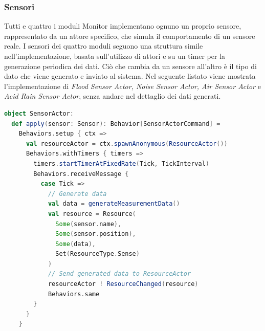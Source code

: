 \documentclass{scrartcl}
\begin{document}
\subsubsection{Sensori}
Tutti e quattro i moduli Monitor implementano ognuno un proprio sensore, rappresentato da un attore specifico, che simula il comportamento di un sensore reale. I sensori dei quattro moduli seguono una struttura simile nell'implementazione, basata sull'utilizzo di attori e su un timer per la generazione periodica dei dati. Ciò che cambia da un sensore all'altro è il tipo di dato che viene generato e inviato al sistema.
Nel seguente listato viene mostrata l'implementazione di \textit{Flood Sensor Actor,
    Noise Sensor Actor, Air Sensor Actor} e \textit{Acid Rain Sensor Actor}, senza andare nel dettaglio dei dati generati.

\begin{lstlisting}[language=Scala]
object SensorActor:
  def apply(sensor: Sensor): Behavior[SensorActorCommand] =
    Behaviors.setup { ctx =>
      val resourceActor = ctx.spawnAnonymous(ResourceActor())
      Behaviors.withTimers { timers =>
        timers.startTimerAtFixedRate(Tick, TickInterval)
        Behaviors.receiveMessage {
          case Tick =>
            // Generate data
            val data = generateMeasurementData()
            val resource = Resource(
              Some(sensor.name),
              Some(sensor.position),
              Some(data),
              Set(ResourceType.Sense)
            )
            // Send generated data to ResourceActor
            resourceActor ! ResourceChanged(resource)
            Behaviors.same
        }
      }
    }
\end{lstlisting}
\end{document}
